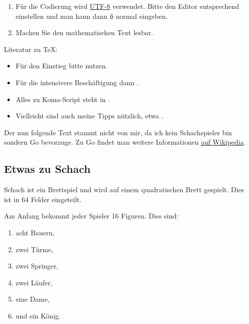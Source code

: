 \begin{refsection}
\begin{itemize}[topsep=1em]
\begin{enumerate}[--]
	\item
	Für die Codierung wird \href{https://de.wikipedia.org/wiki/UTF-8}{UTF-8} verwendet.
	Bitte den Editor entsprechend einstellen und man kann dann \texttt{ö} \etc normal eingeben.
	
	\item
	Machen Sie den mathematischen Text lesbar.
	
\end{enumerate}

\end{itemize}

Literatur zu \TeX{}: 

\begin{itemize}[nosep]
	\item 
	Für den Einstieg bitte \textcite{lshort-german} nutzen.
	
	\item
	Für die intensivere Beschäftigung dann \textcite{voss:2012a,voss:2017b}.
	
	\item
	Alles zu Koma-Script steht in \textcite{kohm:2020}.
	
	\item
	Vielleicht sind auch meine Tipps nützlich, etwa \textcite{latextipps5}.
\end{itemize}

Der nun folgende Text stammt nicht von mir, da ich kein Schachspieler bin sondern Go bevorzuge.
Zu Go findet man weitere Informationen \href{https://bit.ly/3CEdJom}{auf Wikipedia}.

\subsection{Etwas zu Schach}

Schach ist ein Brettspiel und wird auf einem quadratischen Brett gespielt. Dies ist in 64 Felder eingeteilt.

Am Anfang bekommt jeder Spieler 16 Figuren. Dies sind:
\begin{enumerate}[label=\textbullet, nosep]  %
  \item 
  acht Bauern,
  \item 
  zwei Türme,
  \item 
  zwei Springer,
  \item 
  zwei Läufer,
  \item 
  eine Dame,
  \item 
  und ein König.
\end{enumerate}


\end{refsection}
